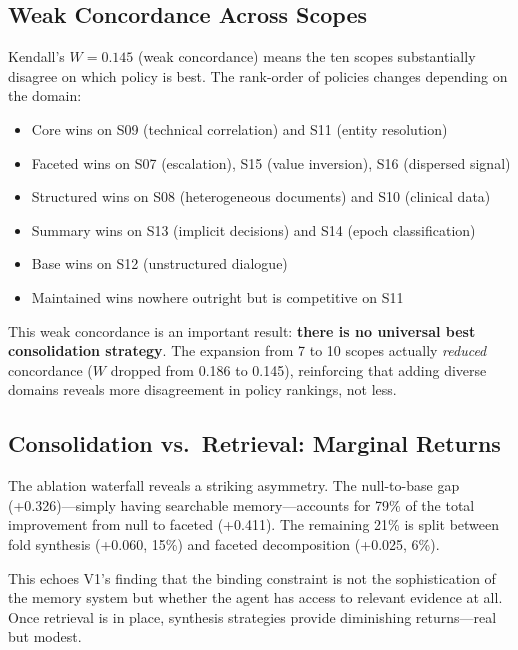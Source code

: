 \documentclass[11pt,a4paper]{article}
\begin{document}
\subsection{Weak Concordance Across Scopes}

Kendall's $W = 0.145$ (weak concordance) means the ten scopes substantially disagree on which policy is best. The rank-order of policies changes depending on the domain:

\begin{itemize}[nosep]
    \item Core wins on S09 (technical correlation) and S11 (entity resolution)
    \item Faceted wins on S07 (escalation), S15 (value inversion), S16 (dispersed signal)
    \item Structured wins on S08 (heterogeneous documents) and S10 (clinical data)
    \item Summary wins on S13 (implicit decisions) and S14 (epoch classification)
    \item Base wins on S12 (unstructured dialogue)
    \item Maintained wins nowhere outright but is competitive on S11
\end{itemize}

This weak concordance is an important result: \textbf{there is no universal best consolidation strategy}. The expansion from 7 to 10 scopes actually \emph{reduced} concordance ($W$ dropped from 0.186 to 0.145), reinforcing that adding diverse domains reveals more disagreement in policy rankings, not less.

\subsection{Consolidation vs.\ Retrieval: Marginal Returns}

The ablation waterfall reveals a striking asymmetry. The null-to-base gap (+0.326)---simply having searchable memory---accounts for 79\% of the total improvement from null to faceted (+0.411). The remaining 21\% is split between fold synthesis (+0.060, 15\%) and faceted decomposition (+0.025, 6\%).

This echoes V1's finding that the binding constraint is not the sophistication of the memory system but whether the agent has access to relevant evidence at all. Once retrieval is in place, synthesis strategies provide diminishing returns---real but modest.

\end{document}
